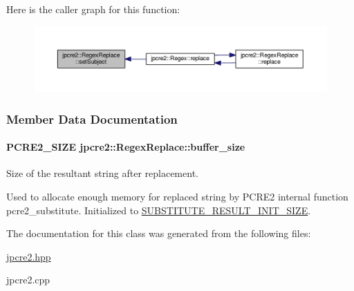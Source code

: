 Here is the caller graph for this function\+:\nopagebreak
\begin{figure}[H]
\begin{center}
\leavevmode
\includegraphics[width=350pt]{classjpcre2_1_1RegexReplace_a46eefdb105827920bebc8436721fa4cb_icgraph}
\end{center}
\end{figure}




\subsubsection{Member Data Documentation}
\paragraph[{\texorpdfstring{buffer\+\_\+size}{buffer_size}}]{\setlength{\rightskip}{0pt plus 5cm}P\+C\+R\+E2\+\_\+\+S\+I\+ZE jpcre2\+::\+Regex\+Replace\+::buffer\+\_\+size\hspace{0.3cm}{\ttfamily [private]}}\hypertarget{classjpcre2_1_1RegexReplace_a44abce541819ceb51e342411b48e95cb}{}\label{classjpcre2_1_1RegexReplace_a44abce541819ceb51e342411b48e95cb}


Size of the resultant string after replacement. 

Used to allocate enough memory for replaced string by P\+C\+R\+E2 internal function pcre2\+\_\+substitute. Initialized to \hyperlink{namespacejpcre2_a80cb201f2e733137b22a8ed98465096a}{S\+U\+B\+S\+T\+I\+T\+U\+T\+E\+\_\+\+R\+E\+S\+U\+L\+T\+\_\+\+I\+N\+I\+T\+\_\+\+S\+I\+ZE}. 

The documentation for this class was generated from the following files\+:\begin{DoxyCompactItemize}
\item 
\hyperlink{jpcre2_8hpp}{jpcre2.\+hpp}\item 
jpcre2.\+cpp\end{DoxyCompactItemize}
